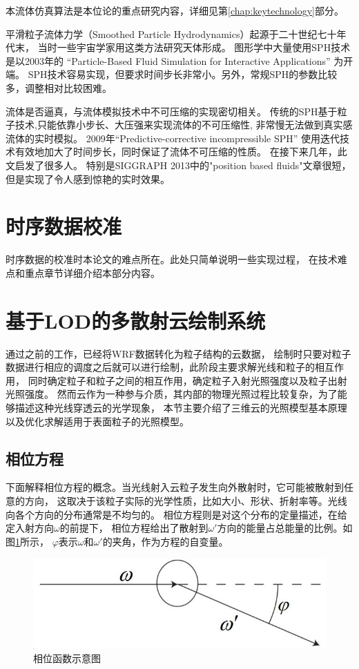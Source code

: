 本流体仿真算法是本位论的重点研究内容，详细见第\ref{chap:keytechnology}部分。

平滑粒子流体力学（Smoothed Particle Hydrodynamics）起源于二十世纪七十年代末，
当时一些宇宙学家用这类方法研究天体形成。
图形学中大量使用SPH技术是以2003年的
“Particle-Based Fluid Simulation for Interactive Applications”
为开端。
SPH技术容易实现，但要求时间步长非常小。另外，常规SPH的参数比较多，调整相对比较困难。

流体是否逼真，与流体模拟技术中不可压缩的实现密切相关。
传统的SPH基于粒子技术,只能依靠小步长、大压强来实现流体的不可压缩性,
非常慢无法做到真实感流体的实时模拟。
2009年“Predictive-corrective incompressible SPH”
使用迭代技术有效地加大了时间步长，同时保证了流体不可压缩的性质。
在接下来几年，此文启发了很多人。
特别是SIGGRAPH 2013中的"position based fluids"文章很短，
但是实现了令人感到惊艳的实时效果。

\section{时序数据校准}

时序数据的校准时本论文的难点所在。此处只简单说明一些实现过程，
在技术难点和重点章节详细介绍本部分内容。

\section{基于LOD的多散射云绘制系统}

通过之前的工作，已经将WRF数据转化为粒子结构的云数据，
绘制时只要对粒子数据进行相应的调度之后就可以进行绘制，此阶段主要求解光线和粒子的相互作用，
同时确定粒子和粒子之间的相互作用，确定粒子入射光照强度以及粒子出射光照强度。
然而云作为一种参与介质，其内部的物理光照过程比较复杂，为了能够描述这种光线穿透云的光学现象，
本节主要介绍了三维云的光照模型基本原理以及优化求解适用于表面粒子的光照模型。

\subsection{相位方程}

下面解释相位方程的概念。当光线射入云粒子发生向外散射时，它可能被散射到任意的方向，
这取决于该粒子实际的光学性质，比如大小、形状、折射率等。光线向各个方向的分布通常是不均匀的。
相位方程则是对这个分布的定量描述，在给定入射方向$\omega$的前提下，
相位方程给出了散射到$\omega'$方向的能量占总能量的比例。如图\ref{fig:phase_function}所示，
$\varphi$表示$\omega$和$\omega'$的夹角，作为方程的自变量。
\begin{figure}
	\centering
	\includegraphics{figure/phase_function.jpg}
	\caption{相位函数示意图}
	\label{fig:phase_function}
\end{figure}

